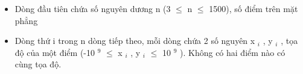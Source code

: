 \begin{itemize}
	\item     Dòng đầu tiên chứa số nguyên dương n (3 $\le$ n $\le$ 1500), số điểm trên mặt phẳng   
	\item     Dòng thứ i trong n dòng tiếp theo, mỗi dòng chứa 2 số nguyên x    $_     i    $    , y    $_     i    $    , tọa độ của một điểm (-10    $^     9    $     $\le$ x    $_     i    $    , y    $_     i    $     $\le$  10    $^     9    $    ). Không có hai điểm nào có cùng tọa độ.   
\end{itemize}

\